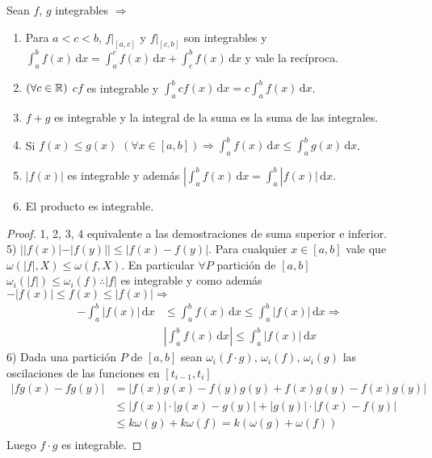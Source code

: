 \begin{theorem}
  Sean $f$, $g$ integrables $\Rightarrow$ \begin{enumerate}
    \item Para $a < c < b$, $f|_{[a, c]}$ y $f|_{[c, b]}$ son integrables y $\int_a^b f(x)\, \mathrm{d}x = \int_a^c f(x)\, \mathrm{d}x + \int_c^b f(x)\, \mathrm{d}x$ y vale la recíproca.
    \item $(\forall c \in \mathbb{R})$ $c f$ es integrable y $\int_a^b c f(x)\, \mathrm{d}x = c \int_a^b f(x)\, \mathrm{d}x$.
    \item $f+g$ es integrable y la integral de la suma es la suma de las integrales.
    \item Si $f(x) \leq g(x)$ $(\forall x \in [a, b]) \Rightarrow \int_a^b f(x) \, \mathrm{d}x \leq \int_a^b g(x) \, \mathrm{d}x$.
    \item $|f(x)|$ es integrable y además $|\int_a^b f(x) \, \mathrm{d}x = \int_a^b |f(x)| \, \mathrm{d}x$.
    \item El producto es integrable.
  \end{enumerate}
  \begin{proof}
    1, 2, 3, 4 equivalente a las demostraciones de suma superior e inferior. \\
    5) $| |f(x)| - |f(y)|| \leq |f(x) - f(y)|$. Para cualquier $x \in [a, b]$ vale que $\omega(|f|, X) \leq \omega(f, X)$. En particular $\forall P$ partición de $[a, b]$ $\omega_i(|f|) \leq \omega_i(f) \therefore |f|$ es integrable y como además $-|f(x)| \leq f(x) \leq |f(x)| \Rightarrow$ 
    \begin{align*}
      -\int_a^b |f(x)| \, \mathrm{d}x & \leq \int_a^b f(x) \, \mathrm{d}x \leq \int_a^b |f(x)| \, \mathrm{d}x \Rightarrow \\
      & | \int_a^b f(x) \, \mathrm{d}x | \leq \int_a^b |f(x)| \, \mathrm{d}x
    \end{align*}
    6) Dada una partición $P$ de $[a, b]$ sean $\omega_i(f \cdot g)$, $\omega_i(f)$, $\omega_i(g)$ las oscilaciones de las funciones en $[t_{i-1}, t_i]$ 
    \begin{align*}
      |fg(x) - fg(y)| & = |f(x)g(x) - f(y)g(y) + f(x)g(y) - f(x)g(y)| \\
      & \leq |f(x)| \cdot |g(x)- g(y)| + |g(y)| \cdot |f(x) - f(y)| \\
      & \leq k \omega(g) + k \omega(f) = k (\omega(g) + \omega(f)) \\
    \end{align*} Luego $f \cdot g$ es integrable.
  \end{proof}
\end{theorem}

